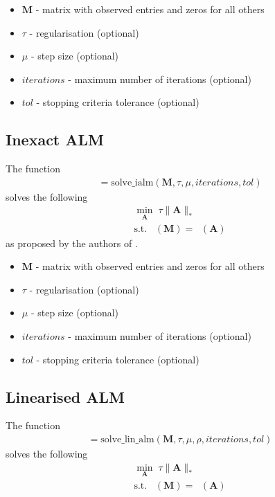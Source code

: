 \documentclass{article}
\DeclareMathOperator*{\pro}{\mathcal P_{\Omega}}
\begin{document}
\begin{itemize}
\item $\mathbf M$ - matrix with observed entries and zeros for all others
\item $\tau$ - regularisation (optional)
\item $\mu$ - step size (optional)
\item $iterations$ - maximum number of iterations (optional)
\item $tol$ - stopping criteria tolerance (optional)
\end{itemize}

\subsection{Inexact ALM}

The function
\begin{align}
[ \mathbf A, \mathbf{f\_vals}, \mathbf{stop\_vals} ] = \text{solve\_ialm}( \mathbf M, \tau, \mu, iterations, tol )
\end{align}
solves the following
\begin{align}
\min_{\mathbf A} \; \tau \| \mathbf A \|_* \\
\text{s.t.} \; \pro (\mathbf M) = \pro (\mathbf A) \nonumber 
\end{align}
as proposed by the authors of \cite{lin2010augmented}.

\begin{itemize}
\item $\mathbf M$ - matrix with observed entries and zeros for all others
\item $\tau$ - regularisation (optional)
\item $\mu$ - step size (optional)
\item $iterations$ - maximum number of iterations (optional)
\item $tol$ - stopping criteria tolerance (optional)
\end{itemize}

\subsection{Linearised ALM}

The function
\begin{align}
[ \mathbf A, \mathbf{f\_vals}, \mathbf{stop\_vals} ] = \text{solve\_lin\_alm}( \mathbf M, \tau, \mu, \rho, iterations, tol )
\end{align}
solves the following
\begin{align}
\min_{\mathbf A} \; \tau \| \mathbf A \|_* \\
\text{s.t.} \; \pro (\mathbf M) = \pro (\mathbf A) \nonumber 
\end{align}
\end{document}
